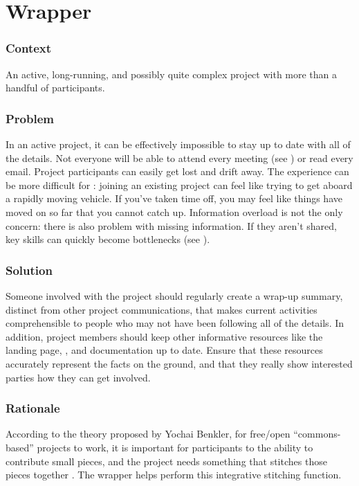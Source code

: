 \begingroup \color{OliveGreen}
\section{Wrapper}\label{sec:Wrapper}

\subsubsection*{Context} An active, long-running, and possibly quite complex project with more than a handful of participants.  

\subsubsection*{Problem} In an active project, it can be effectively impossible to stay up to date with all of the details.  Not everyone will be able to attend every meeting (see ) or read every email.  Project participants can easily get lost and drift away.  The experience can be more difficult for : joining an existing project can feel like trying to get aboard a rapidly moving vehicle.  If you've taken time off, you may feel like things have moved on so far that you cannot catch up.  Information overload is not the only concern: there is also problem with missing information.  If they aren't shared, key skills can quickly become bottlenecks (see ).

\subsubsection*{Solution}
Someone involved with the project should regularly create a wrap-up summary, distinct from other project communications, that makes current activities comprehensible to people who may not have been following all of the details.  In addition, project members should keep other informative resources like the landing page, , and documentation up to date.  Ensure that these resources accurately represent the facts on the ground, and that they really show interested parties how they can get involved.

\subsubsection*{Rationale}
According to the theory proposed by Yochai Benkler, for free/open ``commons-based'' projects to work, it is important for participants to the ability to contribute small pieces, and the project needs something that stitches those pieces together \cite{coases-penguin}.  The wrapper helps perform this integrative stitching function.

